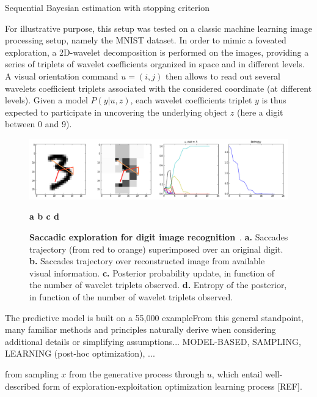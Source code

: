 \documentclass[12pt,twoside,openright]{article}
\begin{document}
	
	
	{\color{magenta} Sequential Bayesian estimation with stopping criterion} 
	
	For illustrative purpose, this setup was tested on a classic machine learning image processing setup, namely the MNIST dataset. In order to mimic a foveated exploration, a 2D-wavelet decomposition is performed on the images, providing a series of triplets of wavelet coefficients organized in space and in different levels. A visual orientation command $u = (i,j)$ then allows to read out several wavelets coefficient triplets associated with the considered coordinate (at different levels). Given a model $P(y|u,z)$, each  wavelet coefficients triplet $y$ is thus expected to participate in uncovering the underlying object $z$ (here a digit between 0 and 9).

	\begin{figure}[t!]
		\centerline{
				\includegraphics[width = \linewidth]{img/figure.png} 
		}
		\centerline{\bf a \hspace{4cm} b \hspace{4cm} c \hspace{4cm} d}
		\caption{\footnotesize{{\bf Saccadic exploration for digit image recognition}~. {\bf a.} Saccades trajectory (from red to orange) superimposed over an original digit. {\bf b.} Saccades trajectory over reconstructed image from available visual information. {\bf c.} Posterior probability update, in function of the number of wavelet triplets observed. {\bf d.} Entropy of the posterior, in function of the number of wavelet triplets observed. } }
	\end{figure}
	
	The predictive model is built on a 55,000 exampleFrom this general standpoint, many familiar methods and principles naturally derive when considering additional details or simplifying assumptions... MODEL-BASED, SAMPLING, LEARNING (post-hoc optimization), ...
	
	{\color{blue} from sampling $x$ from the generative process through $u$, which entail well-described form of exploration-exploitation optimization learning process [REF].}
	
\end{document}
